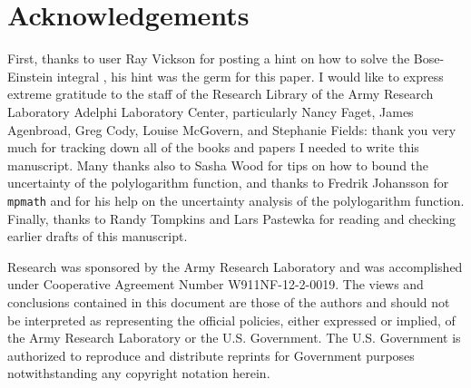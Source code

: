 \documentclass[letterpaper,12pt]{article}
\begin{document}
\section{Acknowledgements}
First, thanks to user Ray Vickson for posting a hint on how to solve the Bose-Einstein integral \cite{https://www.physicsforums.com/threads/a-bose-einstein-integral.751973}, his hint was the germ for this paper. I would like to express extreme gratitude to the staff of the Research Library of the Army Research Laboratory Adelphi Laboratory Center, particularly Nancy Faget, James Agenbroad, Greg Cody, Louise McGovern, and Stephanie Fields: thank you very much for tracking down all of the books and papers I needed to write this manuscript. Many thanks also to Sasha Wood for tips on how to bound the uncertainty of the polylogarithm function, and thanks to Fredrik Johansson for \texttt{mpmath} and for his help on the uncertainty analysis of the polylogarithm function. Finally, thanks to Randy Tompkins and Lars Pastewka for reading and checking earlier drafts of this manuscript.

Research was sponsored by the Army Research Laboratory and was accomplished under Cooperative Agreement Number W911NF-12-2-0019. The views and conclusions contained in this document are those of the authors and should not be interpreted as representing the official policies, either expressed or implied, of the Army Research Laboratory or the U.S. Government. The U.S. Government is authorized to reproduce and distribute reprints for Government purposes notwithstanding any copyright notation herein.




\end{document}
